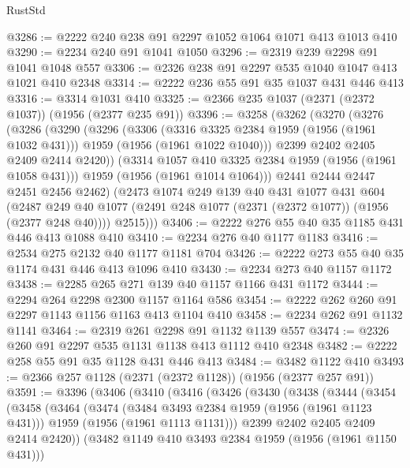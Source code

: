 \begin{lexlean}{RustStd}
\begin{coremodule}
@3286 := @2222 @240 @238 @91 @2297 @1052 @1064 @1071 @413 @1013 @410
@3290 := @2234 @240 @91 @1041 @1050
@3296 := @2319 @239 @2298 @91 @1041 @1048 @557
@3306 := @2326 @238 @91 @2297 @535 @1040 @1047 @413 @1021 @410 @2348
@3314 := @2222 @236 @55 @91 @35 @1037 @431 @446 @413
@3316 := @3314 @1031 @410
@3325 := @2366 @235 @1037 (@2371 (@2372 @1037)) (@1956 (@2377 @235 @91))
@3396 := @3258
    (@3262
      (@3270
        (@3276
          (@3286
            (@3290
              (@3296
                (@3306
                  (@3316 @3325 @2384 @1959 (@1956 (@1961 @1032 @431)))
                  @1959
                  (@1956 (@1961 @1022 @1040)))
                @2399
                @2402
                @2405
                @2409
                @2414
                @2420))
            (@3314 @1057 @410 @3325 @2384 @1959 (@1956 (@1961 @1058 @431)))
            @1959
            (@1956 (@1961 @1014 @1064)))
          @2441
          @2444
          @2447
          @2451
          @2456
          @2462)
        (@2473
          @1074
          @249
          @139
          @40
          @431
          @1077
          @431
          @604
          (@2487 @249 @40 @1077 (@2491 @248 @1077 (@2371 (@2372 @1077)) (@1956 (@2377 @248 @40))))
          @2515)))
@3406 := @2222 @276 @55 @40 @35 @1185 @431 @446 @413 @1088 @410
@3410 := @2234 @276 @40 @1177 @1183
@3416 := @2534 @275 @2132 @40 @1177 @1181 @704
@3426 := @2222 @273 @55 @40 @35 @1174 @431 @446 @413 @1096 @410
@3430 := @2234 @273 @40 @1157 @1172
@3438 := @2285 @265 @271 @139 @40 @1157 @1166 @431 @1172
@3444 := @2294 @264 @2298 @2300 @1157 @1164 @586
@3454 := @2222 @262 @260 @91 @2297 @1143 @1156 @1163 @413 @1104 @410
@3458 := @2234 @262 @91 @1132 @1141
@3464 := @2319 @261 @2298 @91 @1132 @1139 @557
@3474 := @2326 @260 @91 @2297 @535 @1131 @1138 @413 @1112 @410 @2348
@3482 := @2222 @258 @55 @91 @35 @1128 @431 @446 @413
@3484 := @3482 @1122 @410
@3493 := @2366 @257 @1128 (@2371 (@2372 @1128)) (@1956 (@2377 @257 @91))
@3591 := @3396
    (@3406
      (@3410
        (@3416
          (@3426
            (@3430
              (@3438
                (@3444
                  (@3454
                    (@3458
                      (@3464
                        (@3474
                          (@3484 @3493 @2384 @1959 (@1956 (@1961 @1123 @431)))
                          @1959
                          (@1956 (@1961 @1113 @1131)))
                        @2399
                        @2402
                        @2405
                        @2409
                        @2414
                        @2420))
                    (@3482 @1149 @410 @3493 @2384 @1959 (@1956 (@1961 @1150 @431)))

\end{coremodule}
\end{lexlean}
